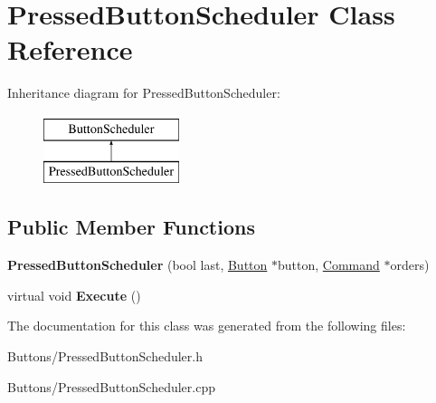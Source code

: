 \hypertarget{classPressedButtonScheduler}{
\section{PressedButtonScheduler Class Reference}
\label{classPressedButtonScheduler}
}
Inheritance diagram for PressedButtonScheduler:\begin{figure}[H]
\begin{center}
\leavevmode
\includegraphics[height=2.000000cm]{classPressedButtonScheduler}
\end{center}
\end{figure}
\subsection*{Public Member Functions}
\begin{DoxyCompactItemize}
\item 
\hypertarget{classPressedButtonScheduler_a6ae86e553e7c10c6b85f893b7cb08c10}{
{\bfseries PressedButtonScheduler} (bool last, \hyperlink{classButton}{Button} $\ast$button, \hyperlink{classCommand}{Command} $\ast$orders)}
\label{classPressedButtonScheduler_a6ae86e553e7c10c6b85f893b7cb08c10}

\item 
\hypertarget{classPressedButtonScheduler_a4ed5ac3f51837796df3dcefea4b5d417}{
virtual void {\bfseries Execute} ()}
\label{classPressedButtonScheduler_a4ed5ac3f51837796df3dcefea4b5d417}

\end{DoxyCompactItemize}


The documentation for this class was generated from the following files:\begin{DoxyCompactItemize}
\item 
Buttons/PressedButtonScheduler.h\item 
Buttons/PressedButtonScheduler.cpp\end{DoxyCompactItemize}
